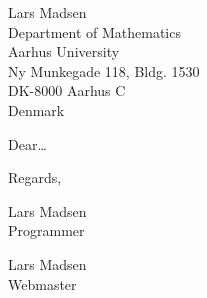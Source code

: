 \documentclass[%
 english,              %
 colorlogo,            %
 unit=math,            %
]{aultrdesign}
\begin{document}
\begin{ColophonData}
\end{ColophonData}
\begin{ReceiverAddress}
  Lars Madsen\\
  Department of Mathematics\\
  Aarhus University\\
  Ny Munkegade 118, Bldg. 1530\\
  DK-8000 Aarhus C\\
  Denmark
\end{ReceiverAddress}

\begin{Letter}
\opening{Dear\dots}

\kant[1] %


\begin{Closing}{Regards,}
  \begin{signer}
    Lars Madsen\\Programmer
  \end{signer}
  \begin{signer}[gfxsignature={\texttt{[image: daleif]}},
    gfxvadjust=-5pt]
    Lars Madsen\\Webmaster
  \end{signer}
\end{Closing}
\end{Letter}
\end{document}
